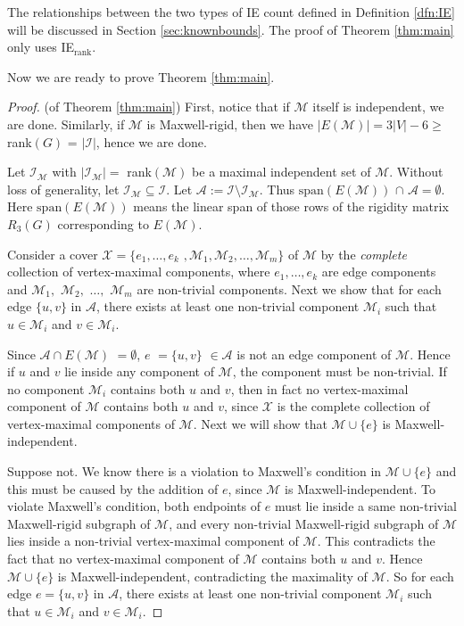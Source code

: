 \documentclass[10pt]{article}
\def\M{\mathcal {M}}
\def\I{\mathcal {I}}
\def\A{\mathcal {A}}
\def\X{\mathcal {X}}
\begin{document}
\medskip
\noindent
The relationships between the two types of IE count defined in Definition \ref{dfn:IE} will be discussed in Section \ref{sec:knownbounds}. The proof of Theorem \ref{thm:main} only uses IE$_\text{rank}$.

Now we are ready to prove Theorem \ref{thm:main}.
\begin{proof}(of Theorem \ref{thm:main})
First, notice that if $\M$ itself is independent, we are done.
Similarly, if $\M$ is Maxwell-rigid, then we have $|E(\M)| = 3|V| -6 \ge$ rank$(G)$ = $|\I|$, hence we are done. 


Let $\I_{\M}$ with $|\I_{\M}| =$ rank$(\M)$ be a maximal independent set of $\M$. Without loss of generality, let $\I_{\M} \subseteq \I$. Let $\A := \I\setminus\I_{\M}$. Thus $\text{span}(E(\M))$ $\cap$ $\A= \emptyset$. Here $\text{span}(E(\M))$ means the linear span of those rows of the rigidity matrix $R_3(G)$ corresponding to $E(\M)$.



Consider a cover $\X=\{e_1, \ldots, e_k$ $, \M_1, \M_2, \ldots, \M_m\}$ of $\M$ by the {\em complete} collection of vertex-maximal components, where $e_1, \ldots, e_k$ are edge components and $\M_1,$ $\M_2,$ $\ldots,$  $\M_m$ are non-trivial components. Next we show that for each edge $\{u, v\}$ in $\A$, there exists at least one non-trivial component $\M_i$ such that $u\in \M_i$ and $v\in \M_i$.


Since $\A \cap E(\M)$ $=\emptyset$, $e$ $=\{u, v\}$ $\in \A$ is not an edge component of $\M$. Hence if $u$ and $v$ lie inside any component of $\M$, the component must be non-trivial. If no component $\M_i$ contains both $u$ and $v$, then in fact no vertex-maximal component of $\M$ contains both $u$ and $v$, since $\X$ is the complete collection of vertex-maximal components of $\M$. Next we will show that $\M \cup \{e\}$ is Maxwell-independent.

Suppose not. We know there is a violation to Maxwell's condition in $\M \cup \{e\}$ and this must be caused by the addition of $e$, since $\M$ is Maxwell-independent. To violate Maxwell's condition, both endpoints of $e$ must lie inside a same non-trivial Maxwell-rigid subgraph of $\M$, and every non-trivial Maxwell-rigid subgraph of $\M$ lies inside a non-trivial vertex-maximal component of $\M$. This contradicts the fact that no vertex-maximal component of $\M$ contains both $u$ and $v$. Hence $\M \cup \{e\}$ is Maxwell-independent, contradicting the maximality of $\M$. So for each edge $e=\{u, v\}$ in $\A$, there exists at least one non-trivial component $\M_i$ such that $u\in \M_i$ and $v\in \M_i$. 



\end{proof}
\end{document}
